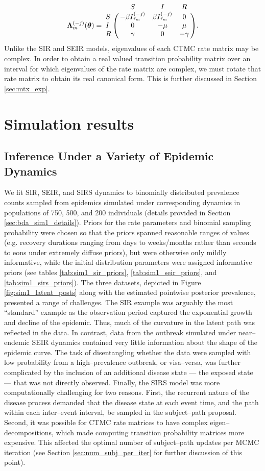 \begin{equation} \bLambda_m^{(-j)}(\btheta) = \bordermatrix{ & S & I & R \cr
	S & -\beta I_{\tau_m}^{(-j)} & \beta I_{\tau_m}^{(-j)} & 0  \cr 
	I & 0 & -\mu & \mu \cr
	R & \gamma & 0 & -\gamma }.
\end{equation}
Unlike the SIR and SEIR models, eigenvalues of each CTMC rate matrix may be complex. In order to obtain a real valued transition probability matrix over an interval for which eigenvalues of the rate matrix are complex, we must rotate that rate matrix to obtain its real canonical form. This is further discussed in Section \ref{sec:mtx_exp}.

\section{Simulation results}
\label{sec:bda_simulations}

\subsection{Inference Under a Variety of Epidemic Dynamics}
\label{subsec:bda_sir_seir_sirs_sim}
We fit SIR, SEIR, and SIRS dynamics to binomially distributed prevalence counts sampled from epidemics simulated under corresponding dynamics in populations of 750, 500, and 200 individuals (details provided in Section \ref{sec:bda_sim1_details}). Priors for the rate parameters and binomial sampling probability were chosen so that the priors spanned reasonable ranges of values (e.g. recovery durations ranging from days to weeks/months rather than seconds to eons under extremely diffuse priors), but were otherwise only mildly informative, while the initial distribution parameters were assigned informative priors (see tables \ref{tab:sim1_sir_priors}, \ref{tab:sim1_seir_priors}, and \ref{tab:sim1_sirs_priors}). The three datasets, depicted in Figure \ref{fig:sim1_latent_posts} along with the estimated pointwise posterior prevalence, presented a range of challenges. The SIR example was arguably the most ``standard'' example as the observation period captured the exponential growth and decline of the epidemic. Thus, much of the curvature in the latent path was reflected in the data. In contrast, data from the outbreak simulated under near--endemic SEIR dynamics contained very little information about the shape of the epidemic curve. The task of disentangling whether the data were sampled with low probability from a high--prevalence outbreak, or visa--versa, was further complicated by the inclusion of an additional disease state --- the exposed state --- that was not directly observed. Finally, the SIRS model was more computationally challenging for two reasons. First, the recurrent nature of the disease process demanded that the disease state at each event time, and the path within each inter--event interval, be sampled in the subject--path proposal. Second, it was possible for CTMC rate matrices to have complex eigen--decompositions, which made computing transition probability matrices more expensive. This affected the optimal number of subject--path updates per MCMC iteration (see Section \ref{sec:num_subj_per_iter} for further discussion of this point).


